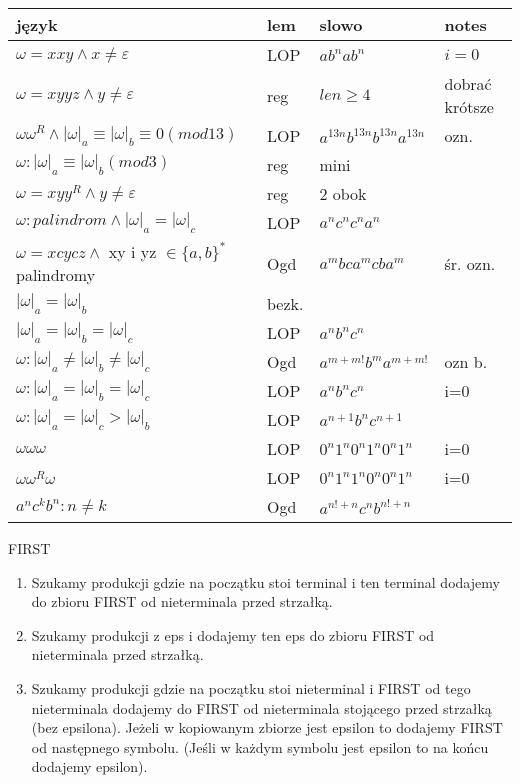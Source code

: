 
\begin{tabular}{l|l|l|l}
  język & lem & slowo & notes\\
  \hline
    $\omega = xxy \wedge x \neq \varepsilon $ & LOP & 
    $ab^{n}ab^{n}$ & $i=0$ \\
  \hline 
    $\omega = xyyz \wedge y \neq \varepsilon $ & reg & 
    $len \geqslant 4$ & dobrać krótsze \\
  \hline
    $\omega \omega ^{R} \wedge |\omega|_{a}\equiv |\omega|_{b} \equiv 0 (mod 13) $ & LOP & 
    $a^{13n}b^{13n}b^{13n}a^{13n}$ & ozn. \\
  \hline
  $\omega : |\omega|_{a}\equiv |\omega|_{b}(mod 3) $ & reg & 
  mini & \\
  \hline
    $\omega = xyy^{R} \wedge y \neq \varepsilon$ & reg & 
    2 obok & \\
  \hline
    $\omega:palindrom \wedge |\omega|_{a} = |\omega|_{c} $ & LOP & 
    $a^{n}c^{n}c^{n}a^{n}$ \\
  \hline
    $\omega = xcycz \wedge$ xy i yz $\in \lbrace a,b \rbrace ^{*}$palindromy & Ogd & $a^{m}bca^{m}cba^{m}$ & śr. ozn. \\
  \hline
    $|\omega|_{a} = |\omega|_{b}$ & bezk. & \\
  \hline
    $|\omega|_{a} = |\omega|_{b}= |\omega|_{c}$ & LOP & $a^{n}b^{n}c^{n}$ & \\
  \hline
    $\omega : |\omega|_{a} \neq |\omega|_{b} \neq |\omega|_{c}$ & Ogd & $a^{m+m!}b^{m}a^{m+m!}$ & ozn b.\\
  \hline 
    $\omega : |\omega|_{a} = |\omega|_{b} = |\omega|_{c}$ & LOP & $a^{n}b^{n}c^{n}$ & i=0\\
  \hline
    $\omega : |\omega|_{a} = |\omega|_{c} > |\omega|_{b}$ & LOP & $a^{n+1}b^{n}c^{n+1}$ &\\
  \hline
    $\omega\omega\omega$ & LOP & $0^{n}1^{n}0^{n}1^{n}0^{n}1^{n}$ & i=0\\
  \hline
    $\omega\omega^{R}\omega$ & LOP & $0^{n}1^{n}1^{n}0^{n}0^{n}1^{n}$ & i=0\\
  \hline
    $a^{n}c^{k}b^{n} : n \neq k$ & Ogd & $a^{n!+n}c^{n}b^{n!+n}$& \\
\end{tabular}


FIRST
\begin{enumerate}
  \item Szukamy produkcji gdzie na początku stoi terminal i ten terminal dodajemy do zbioru FIRST od nieterminala przed strzałką.
  \item Szukamy produkcji z eps i dodajemy ten eps do zbioru FIRST od nieterminala przed strzałką.
  \item Szukamy produkcji gdzie na początku stoi nieterminal i FIRST od tego nieterminala dodajemy do FIRST od nieterminala stojącego przed strzałką (bez epsilona). Jeżeli w kopiowanym zbiorze jest epsilon to dodajemy FIRST od następnego symbolu. (Jeśli w każdym symbolu jest epsilon to na końcu dodajemy epsilon).
\end{enumerate}

